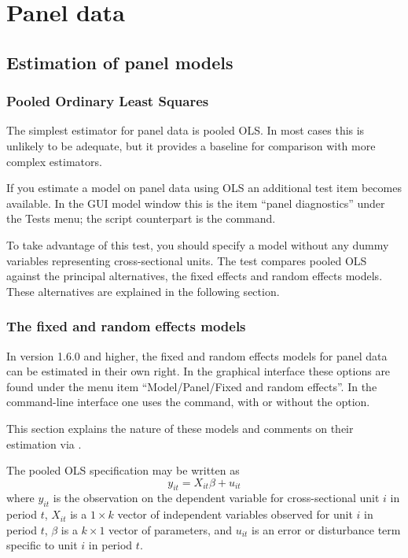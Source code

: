 \chapter{Panel data}
\label{chap-panel}

\section{Estimation of panel models}

\subsection{Pooled Ordinary Least Squares}
\label{pooled-est}

The simplest estimator for panel data is pooled OLS.  In most cases
this is unlikely to be adequate, but it provides a baseline for
comparison with more complex estimators.

If you estimate a model on panel data using OLS an additional test
item becomes available.  In the GUI model window this is the item
``panel diagnostics'' under the \textsf{Tests} menu; the script
counterpart is the  command.

To take advantage of this test, you should specify a model without any
dummy variables representing cross-sectional units.  The test compares
pooled OLS against the principal alternatives, the fixed effects and
random effects models.  These alternatives are explained in the
following section.

\subsection{The fixed and random effects models}
\label{panel-est}

In  version 1.6.0 and higher, the fixed and random effects
models for panel data can be estimated in their own right.  In the
graphical interface these options are found under the menu item
``Model/Panel/Fixed and random effects''.  In the command-line
interface one uses the  command, with or without the
 option.

This section explains the nature of these models and comments on their
estimation via .

The pooled OLS specification may be written as 
\begin{equation}
\label{eq:pooled}
y_{it} = X_{it}\beta + u_{it}
\end{equation}
where $y_{it}$ is the observation on the dependent variable for
cross-sectional unit $i$ in period $t$, $X_{it}$ is a $1\times k$
vector of independent variables observed for unit $i$ in period $t$,
$\beta$ is a $k\times 1$ vector of parameters, and $u_{it}$ is an error
or disturbance term specific to unit $i$ in period $t$.

